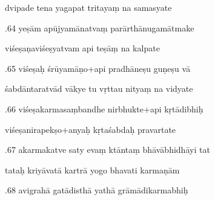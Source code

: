 \documentclass[article,12pt,a4paper]{memoir}%
\newcounter{parCount}
\begin{document}
	  
	  \pstart \leavevmode%
	dvipade tena yagapat tritayaṃ na samasyate 
	{}
	\pend%
      

	  
	  \pstart {}.64 yeṣām apūjyamānatvaṃ parārthānugamātmake 
	{}
	\pend%
      

	  
	  \pstart \leavevmode%
	viśeṣaṇaviśeṣyatvam api teṣāṃ na kalpate 
	{}
	\pend%
      

	  
	  \pstart {}.65 viśeṣaḥ śrūyamāṇo+api pradhāneṣu guṇeṣu vā 
	{}
	\pend%
      

	  
	  \pstart \leavevmode%
	śabdāntaratvād vākye tu vṛttau nityaṃ na vidyate 
	{}
	\pend%
      

	  
	  \pstart {}.66 viśeṣakarmasaṃbandhe nirbhukte+api kṛtādibhiḥ 
	{}
	\pend%
      

	  
	  \pstart \leavevmode%
	viśeṣanirapekṣo+anyaḥ kṛtaśabdaḥ pravartate 
	{}
	\pend%
      

	  
	  \pstart {}.67 akarmakatve saty evaṃ ktāntaṃ bhāvābhidhāyi tat 
	{}
	\pend%
      

	  
	  \pstart \leavevmode%
	tataḥ kriyāvatā kartrā yogo bhavati karmaṇām 
	{}
	\pend%
      

	  
	  \pstart {}.68 avigrahā gatādisthā yathā grāmādikarmabhiḥ 
	{}
	\pend%
      
\end{document}
